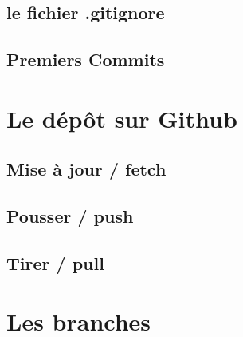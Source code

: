 \documentclass[10pt]{beamer}
\begin{document}
\subsection{le fichier .gitignore}
\subsection{Premiers Commits}


\section{Le dépôt sur Github}

\subsection{Mise à jour / fetch}
\subsection{Pousser / push}
\subsection{Tirer / pull}


\section{Les branches}
\end{document}
